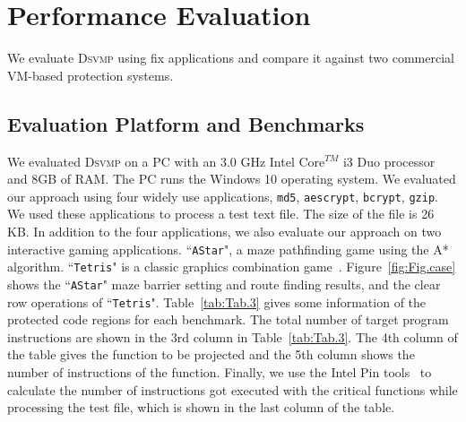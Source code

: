 \documentclass[preprint,12pt,3p]{elsarticle}
\newcommand{\DSVMP}{\textsc{Dsvmp}\xspace}
\begin{document}
\section{Performance Evaluation}\label{sec:p-eva}
We evaluate \DSVMP using fix  applications
and compare it against two commercial VM-based protection systems.

\subsection{Evaluation Platform and Benchmarks}
We evaluated \DSVMP on a PC with an 3.0 GHz Intel Core$^{TM}$ i3 Duo processor and 8GB of RAM.
The PC runs the Windows 10 operating system. We evaluated our approach using four widely use applications, \texttt{md5}, \texttt{aescrypt}, \texttt{bcrypt}, \texttt{gzip}.
We used these applications to process a test text file. The size of the file is 26 KB.
In addition to the four applications, we also evaluate our approach on two interactive gaming applications.
``\texttt{AStar}", a maze pathfinding game using the A* algorithm. ``\texttt{Tetris}" is a classic graphics combination game~\cite{benchmark}.
Figure~\ref{fig:Fig.case} shows the ``\texttt{AStar}" maze barrier setting and route finding results, and the clear row operations of ``\texttt{Tetris}".
Table~\ref{tab:Tab.3} gives some information of the protected code regions for each benchmark.
The total number of target program instructions are shown in the 3rd column in Table~\ref{tab:Tab.3}.
The 4th column of the table gives the function to be projected
and the 5th column shows the number of instructions of the function.
Finally, we use the Intel Pin tools~\cite{pin} to calculate the number of instructions got executed with the critical functions
while processing the test file, which is shown in the last column of the table.


\end{document}
